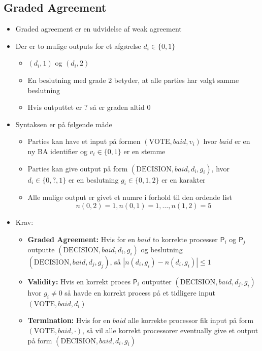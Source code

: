 \documentclass[a4, english]{article}
\begin{document}
\subsection{Graded Agreement}
\begin{itemize}
	\item Graded agreement er en udvidelse af weak agreement 
 	\item Der er to mulige outputs for et afgørelse $d_i \in \{0, 1\}$  
  \begin{itemize}
    \item $(d_i,1)$ og $(d_i,2)$
    \item En beslutning med grade 2 betyder, at alle parties har valgt samme beslutning
    \item Hvis outputtet er $?$ så er graden altid $0$  
  \end{itemize}
  \item Syntaksen er på følgende måde 
  \begin{itemize}
  	\item Parties kan have et input på formen $(\text{VOTE}, baid, v_i)$ hvor $baid$ er en ny BA identifier og $v_i \in \{0,1\}$ er en stemme
	  \item Parties kan give output på form $(\text{DECISION}, baid, d_i, g_i)$, hvor $d_i \in \{0,?,1\}$ er en beslutning $g_i \in \{0,1,2\}$ er en karakter 
  	\item Alle mulige output er givet et numre i forhold til den ordende list 
  \begin{equation*}
    n(0,2) = 1, n(0,1) = 1, \dots, n(1,2) =5 
  \end{equation*}
  \end{itemize}
  \item Krav:
  \begin{itemize}
  	\item \textbf{Graded Agreement:} Hvis for en $baid$ to korrekte processer $\mathsf P_i$ og $\mathsf P_j$ outputte $(\text{DECISION}, baid,d_i, g_i)$ og beslutning $(\text{DECISION}, baid,d_j, g_j)$, så $|n(d_i,g_i) - n(d_i,g_i)| \leq 1$
    \item \textbf{Validity:} Hvis en korrekt proces $\mathsf P_i$ outputter $(\text{DECISION}, baid,d_j, g_i)$ hvor $g_i \ne 0$ så havde en korrekt process på et tidligere input $(\text{VOTE}, baid, d_i)$
    \item \textbf{Termination:} Hvis for en $baid$ alle korrekte processor fik input på form $(\text{VOTE}, baid, \cdot)$, så vil alle korrekt processorer eventually give et output på form $(\text{DECISION}, baid,d_i, g_i)$ 

\end{itemize}
\end{itemize}
\end{document}
